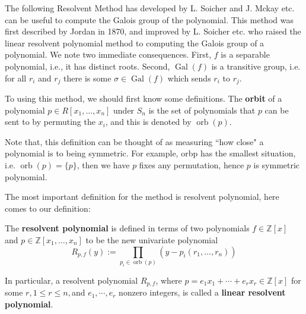 The following Resolvent Method has developed by L. Soicher and J. Mckay etc. can be useful to compute the Galois group of the polynomial. This method was first described by Jordan\citep{jordan1870traite} in 1870, and improved by 
L. Soicher etc.\citep{soicher1985computing} who raised the linear resolvent polynomial method to computing the Galois group of a polynomial. We note two immediate consequences. First, $f$ is a separable polynomial, i.e., it has distinct roots. Second, $\operatorname{Gal}(f)$ is a transitive group, i.e. for all $r_i$ and $r_j$ there is some $\sigma\in\operatorname{Gal}(f)$ which sends $r_i$ to $r_j$.

To using this method, we should first know some definitions. The \textbf{orbit} of a polynomial $p\in R[x_1,\dots,x_n]$ under $S_n$ is the set of polynomials that $p$ can be sent to by permuting the $x_i$, and this is denoted by $\operatorname{orb}(p)$.

Note that, this definition can be thought of as measuring ``how close" a polynomial is to being symmetric. For example, orb{p} has the smallest situation, i.e. $\operatorname{orb}(p)=\{p\}$, then we have $p$ fixes any permutation, hence $p$ is symmetric polynomial.

The most important definition for the method is resolvent polynomial, here comes to our definition:
\begin{definition}
The \textbf{resolvent polynomial} is defined in terms of two polynomials $f\in\mathbb{Z}[x]$ and $p\in\mathbb{Z}[x_1,\dots,x_n]$ to be the new univariate polynomial
$$R_{p,f}(y):=\prod_{p_i\in\operatorname{orb}(p)}(y-p_i(r_1,\dots,r_n))$$
\end{definition}

In particular, a resolvent polynomial $R_{p,f}$, where $p=e_1x_1+\cdots+e_rx_r\in\mathbb{Z}[x]$ for some $r,1\leq r\leq n,$and $e_1,\cdots,e_r$ nonzero integers, is called a \textbf{linear resolvent polynomial}.



